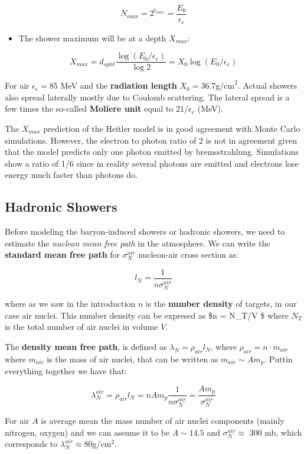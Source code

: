 \documentclass[
  letterpaper,
  DIV=11,
  numbers=noendperiod]{scrreprt}
\providecommand{\tightlist}{%
  \setlength{\itemsep}{0pt}\setlength{\parskip}{0pt}}\usepackage{longtable,booktabs,array}
\begin{document}
\[N_{max} = 2^{t_{max}} = \frac{E_0}{\epsilon_e}\]

\begin{itemize}
\tightlist
\item
  The shower maximum will be at a depth \(X_{max}\):
\end{itemize}

\[X_{max}=d_{split} \frac{\log(E_0/\epsilon_e)}{\log2} = X_0 \log(E_0/\epsilon_e)\]

For air \(\epsilon_e = 85\) MeV and the \textbf{radiation length}
\(X_0 = 36.7 \mathrm{ g/cm}^2\). Actual showers also spread laterally
mostly due to Coulomb scattering. The lateral spread is a few times the
so-called \textbf{Moliere unit} equal to \(21/\epsilon_e\) (MeV).

The \(X_{max}\) prediction of the Heitler model is in good agreement
with Monte Carlo simulations. However, the electron to photon ratio of 2
is not in agreement given that the model predicts only one photon
emitted by bremsstrahlung. Simulations show a ratio of 1/6 since in
reality several photons are emitted and electrons lose energy much
faster than photons do.

\subsection*{Hadronic Showers}\label{hadronic-showers}

Before modeling the baryon-induced showers or hadronic showers, we need
to estimate the \emph{nuclean mean free path} in the atmosphere. We can
write the \textbf{standard mean free path} for \(\sigma^{air}_N\)
nucleon-air cross section as:

\[l_N = \frac{1}{n \sigma_N^{air}}\]

where as we saw in the introduction \(n\) is the \textbf{number density}
of targets, in our case air nuclei. This number density can be expresed
as \$n = N\_T/V \$ where \(N_T\)is the total number of air nuclei in
volume \(V\).

The \textbf{density mean free path}, is defined as
\(\lambda_N = \rho_{air} l_N\), where \(\rho_{air} = n \cdot m_{air}\)
where \(m_{air}\) is the mass of air nuclei, that can be written as
\(m_{air} \sim A m_p\). Puttin everything together we have that:

\[\lambda^{air}_N = \rho_{air} l_N = n A m_p\frac{1}{n\sigma_N^{air}} = \frac{A m_{p}}{\sigma_N^{air}}\]

For air \(A\) is average mean the mass number of air nuclei components
(mainly nitrogen, oxygen) and we can assume it to be \(A \sim 14.5\) and
\(\sigma_N^{air} \approx\) 300 mb, which corresponds to
\(\lambda_N^{air} \approx 80\)g/cm\(^{2}\).
\end{document}
